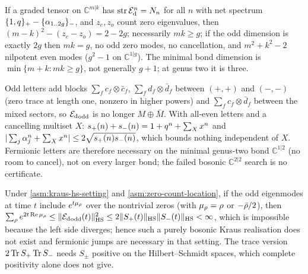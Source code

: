 \begin{proposition}
\label{prop:euler-bookkeeping}
If a graded tensor on $\mathbb C^{m|k}$ has $\operatorname{str}\mathcal E_{\mathrm d}^n = N_{n}$ for all $n$ with net spectrum
$\{1,q\}_+-\{\alpha_{1..2g}\}_-$, and $z_e,z_o$ count zero eigenvalues, then
$(m-k)^2-(z_e-z_o) = 2-2g$; necessarily $mk\ge g$; if the odd dimension is exactly $2g$ then
$mk = g$, no odd zero modes, no cancellation, and $m^2+k^2-2$ nilpotent even modes ($g^2-1$ on
$\mathbb C^{1|g}$). The minimal bond dimension is $\min\{m+k: mk\ge g\}$, not generally $g+1$;
at genus two it is three.
\end{proposition}

\begin{proposition}
\label{prop:odd-species-cancellation}
Odd letters add blocks $\sum_fc_f\otimes\bar c_f$, $\sum_fd_f\otimes\bar d_f$ between $(+,+)$ and
$(-,-)$ (zero trace at length one, nonzero in higher powers) and $\sum_fc_f\otimes\bar d_f$
between the mixed sectors, so ${\mathcal E_{\mathrm d}}_{\mathrm{odd}}$ is no longer $M\oplus\bar M$. With all-even
letters and a cancelling multiset $X$: $s_+(n)+s_-(n) = 1+q^n+\sum_Xx^n$ and
$|\sum_j\alpha_{j}^n+\sum_Xx^n|\le2\sqrt{s_+(n)s_-(n)}$, which bounds nothing independent of
$X$. Fermionic letters are therefore necessary on the minimal genus-two bond $\mathbb C^{1|2}$
(no room to cancel), not on every larger bond; the failed bosonic $\mathbb C^{2|2}$ search is
no certificate.
\end{proposition}

\begin{theorem}
\label{thm:infinite-bond-bosonic-nogo}
Under \cref{asm:kraus-hs-setting} and \cref{asm:zero-count-location}, if the odd eigenmodes at
time $t$ include $e^{t\mu_{\rho}}$ over the nontrivial zeros (with $\mu_{\rho} = \rho$ or %
$-\bar{\rho}/2$), then $\sum_{\zero}e^{2t\operatorname{Re}\mu_{\zero}}\le\|{\Edb}_{\mathrm{odd}}(t)\|_{\mathrm{HS}}^2 %
\le2\|S_+(t)\|_{\mathrm{HS}}\|S_-(t)\|_{\mathrm{HS}}<\infty$, which is impossible because the
left side diverges; hence such a purely bosonic Kraus realisation does not exist and fermionic
jumps are necessary in that setting. The trace version $2\operatorname{Tr} S_+\operatorname{Tr} S_-$ needs $S_\pm$ positive
on the Hilbert--Schmidt spaces, which complete positivity alone does not give.
\end{theorem}

